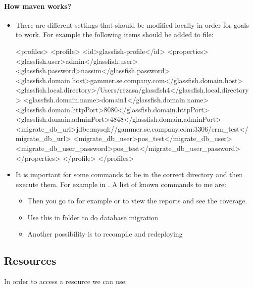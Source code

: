 \paragraph{How maven works?}
\begin{itemize}
	\item There are different settings that should be modified locally in-order for goals to work. For example the following items should be added to  file: \newline
	\begin{javacode}[profile]
	    <profiles>
		    <profile>
			    <id>glassfish-profile</id>
			    <properties>
				    <glassfish.user>admin</glassfish.user>
				    <glassfish.password>nassim</glassfish.password>
				    <glassfish.domain.host>gammer.se.company.com</glassfish.domain.host>
				    <glassfish.local.directory>/Users/rezasa/glassfish4</glassfish.local.directory>
				    <glassfish.domain.name>domain1</glassfish.domain.name>
				    <glassfish.domain.httpPort>8080</glassfish.domain.httpPort>
				    <glassfish.domain.adminPort>4848</glassfish.domain.adminPort>
				    <migrate_db_url>jdbc:mysql://gammer.se.company.com:3306/crm_test</migrate_db_url>
				    <migrate_db_user>pos_test</migrate_db_user>
				    <migrate_db_user_password>pos_test</migrate_db_user_password>
			    </properties>
		    </profile>
	    </profiles>
	\end{javacode}
	\item It is important for some commands to be in the correct directory and then execute them. For example in . A list of known commands to me are:
	\begin{itemize}
		\item {}\newline
		Then you go to for example  or  to view the reports and see the coverage.
		\item {}\newline
		Use this in  folder to do database migration
		\item Another possibility is to recompile and redeploying\newline
	\end{itemize}
\end{itemize}
	

\subsection{Resources}
In order to access a resource we can use:


